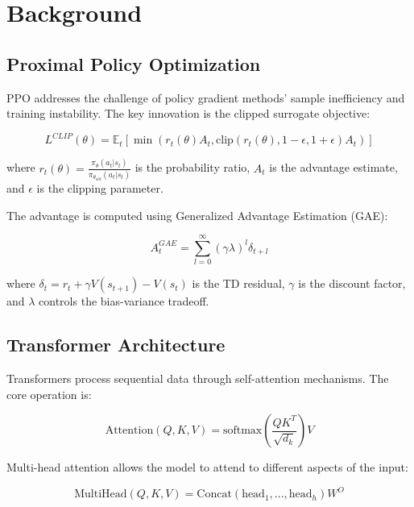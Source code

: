 \documentclass[12pt,a4paper]{article}
\begin{document}
\section{Background}

\subsection{Proximal Policy Optimization}

PPO addresses the challenge of policy gradient methods' sample inefficiency and training instability. The key innovation is the clipped surrogate objective:

\begin{equation}
L^{CLIP}(\theta) = \mathbb{E}_t \left[ \min(r_t(\theta)A_t, \text{clip}(r_t(\theta), 1-\epsilon, 1+\epsilon)A_t) \right]
\end{equation}

where $r_t(\theta) = \frac{\pi_\theta(a_t|s_t)}{\pi_{\theta_{old}}(a_t|s_t)}$ is the probability ratio, $A_t$ is the advantage estimate, and $\epsilon$ is the clipping parameter.

The advantage is computed using Generalized Advantage Estimation (GAE):

\begin{equation}
A_t^{GAE} = \sum_{l=0}^{\infty} (\gamma\lambda)^l \delta_{t+l}
\end{equation}

where $\delta_t = r_t + \gamma V(s_{t+1}) - V(s_t)$ is the TD residual, $\gamma$ is the discount factor, and $\lambda$ controls the bias-variance tradeoff.

\subsection{Transformer Architecture}

Transformers process sequential data through self-attention mechanisms. The core operation is:

\begin{equation}
\text{Attention}(Q, K, V) = \text{softmax}\left(\frac{QK^T}{\sqrt{d_k}}\right)V
\end{equation}

Multi-head attention allows the model to attend to different aspects of the input:

\begin{equation}
\text{MultiHead}(Q, K, V) = \text{Concat}(\text{head}_1, ..., \text{head}_h)W^O
\end{equation}
\end{document}
